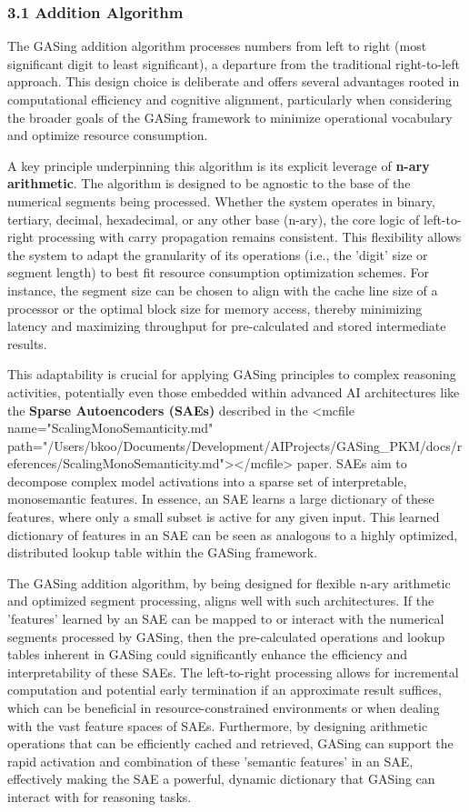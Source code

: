 \subsubsection{3.1 Addition Algorithm}

The GASing addition algorithm processes numbers from left to right (most significant digit to least significant), a departure from the traditional right-to-left approach. This design choice is deliberate and offers several advantages rooted in computational efficiency and cognitive alignment, particularly when considering the broader goals of the GASing framework to minimize operational vocabulary and optimize resource consumption.

A key principle underpinning this algorithm is its explicit leverage of \textbf{n-ary arithmetic}. The algorithm is designed to be agnostic to the base of the numerical segments being processed. Whether the system operates in binary, tertiary, decimal, hexadecimal, or any other base (n-ary), the core logic of left-to-right processing with carry propagation remains consistent. This flexibility allows the system to adapt the granularity of its operations (i.e., the 'digit' size or segment length) to best fit resource consumption optimization schemes. For instance, the segment size can be chosen to align with the cache line size of a processor or the optimal block size for memory access, thereby minimizing latency and maximizing throughput for pre-calculated and stored intermediate results.

This adaptability is crucial for applying GASing principles to complex reasoning activities, potentially even those embedded within advanced AI architectures like the \textbf{Sparse Autoencoders (SAEs)} described in the <mcfile name="ScalingMonoSemanticity.md" path="/Users/bkoo/Documents/Development/AIProjects/GASing\_PKM/docs/references/ScalingMonoSemanticity.md"></mcfile> paper. SAEs aim to decompose complex model activations into a sparse set of interpretable, monosemantic features. In essence, an SAE learns a large dictionary of these features, where only a small subset is active for any given input. This learned dictionary of features in an SAE can be seen as analogous to a highly optimized, distributed lookup table within the GASing framework. 

The GASing addition algorithm, by being designed for flexible n-ary arithmetic and optimized segment processing, aligns well with such architectures. If the 'features' learned by an SAE can be mapped to or interact with the numerical segments processed by GASing, then the pre-calculated operations and lookup tables inherent in GASing could significantly enhance the efficiency and interpretability of these SAEs. The left-to-right processing allows for incremental computation and potential early termination if an approximate result suffices, which can be beneficial in resource-constrained environments or when dealing with the vast feature spaces of SAEs. Furthermore, by designing arithmetic operations that can be efficiently cached and retrieved, GASing can support the rapid activation and combination of these 'semantic features' in an SAE, effectively making the SAE a powerful, dynamic dictionary that GASing can interact with for reasoning tasks.


